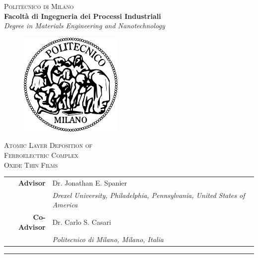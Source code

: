 \begin{titlepage}
\vspace*{-3cm}
\begin{center}
  {\LARGE
  \textsc{Politecnico di Milano}\\
  \textbf{\Large
  Facolt\`a di Ingegneria dei Processi Industriali}\\
  \emph{\large Degree in Materials Engineering and Nanotechnology}}\\
  \vspace*{0.5cm}
  \begin{figure}[htbp]
    \begin{center}
      \includegraphics[width=5cm]{./pictures/logopm.png}
    \end{center}
  \end{figure}
  \vspace{-0.3cm}
   {\huge\textsc{
  Atomic Layer Deposition of \\
  Ferroelectric Complex\\Oxide Thin Films\\
  }}

  
  
\end{center}
\vspace{0.3cm} 
\large
\begin{centering}

\begin{tabular*}{0.75\textwidth}{>{\bfseries}r l}
  Advisor & Dr. Jonathan E. Spanier \\
  & \emph{\tiny Drexel University, Philadelphia, Pennsylvania, United States of America}\\
  Co-Advisor  & Dr. Carlo S. Casari \\
  & \emph{\tiny Politecnico di Milano, Milano, Italia}
  \vspace{0.3cm}
\end{tabular*}

\end{centering}
\rule{\linewidth}{0.5mm}
\begin{centering}


\end{centering}
\end{titlepage}
